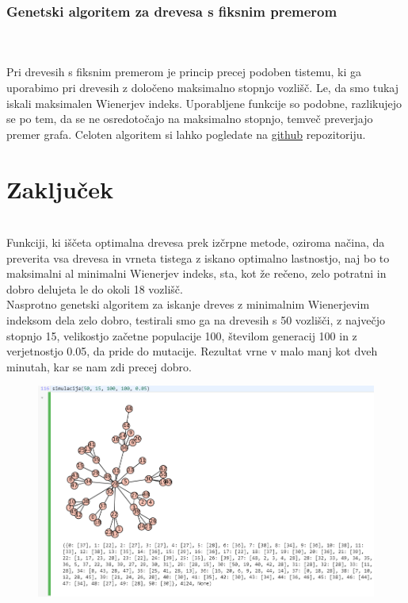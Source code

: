 \documentclass[12pt,a4paper]{amsart}
\theoremstyle{definition} %
\theoremstyle{plain} %
\begin{document}
\subsubsection{Genetski algoritem za drevesa s fiksnim premerom}
\
\\
\\
Pri drevesih s fiksnim premerom je princip precej podoben tistemu, ki ga uporabimo pri drevesih z določeno maksimalno stopnjo vozlišč. Le, da smo tukaj iskali maksimalen Wienerjev indeks.
Uporabljene funkcije so podobne, razlikujejo se po tem, da se ne osredotočajo na maksimalno stopnjo, temveč preverjajo premer grafa. Celoten algoritem si lahko pogledate na \href{https://github.com/HovnikK15/Prescribed-trees-with-max-min-Wiener-index/blob/master/Genetic%20algorithm%20for%20max%20Wiener%20index.sagews}{github} repozitoriju.
\newpage
\section{Zaključek}
\
\\
Funkciji, ki iščeta optimalna drevesa prek izčrpne metode, oziroma načina, da preverita vsa drevesa in vrneta tistega
z iskano optimalno lastnostjo, naj bo to maksimalni al minimalni Wienerjev indeks, sta, kot že rečeno, zelo potratni in dobro
delujeta le do okoli 18 vozlišč. 
\\
Nasprotno genetski algoritem za iskanje dreves z minimalnim Wienerjevim indeksom dela zelo dobro, testirali smo ga na drevesih s 50 vozlišči,
z največjo stopnjo 15, velikostjo začetne populacije 100, številom generacij 100 in z verjetnostjo 0.05, da pride do mutacije. Rezultat vrne v malo manj kot dveh minutah, kar se nam zdi precej dobro.
\begin{figure}[ht]
\centering
\includegraphics[width=1\textwidth]{slika7}
\end{figure}
\end{document}

